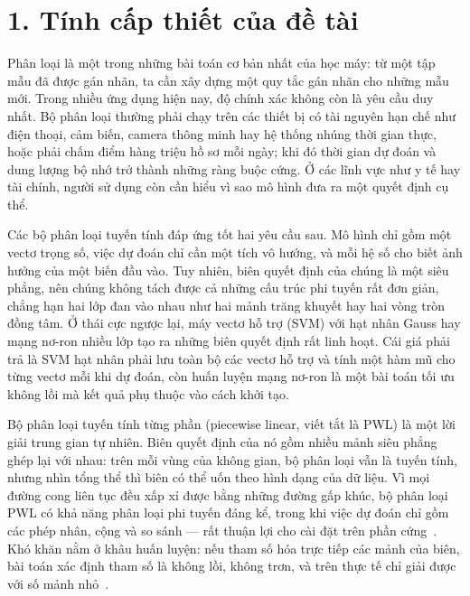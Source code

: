
\section*{1. Tính cấp thiết của đề tài}

Phân loại là một trong những bài toán cơ bản nhất của học máy: từ một tập mẫu đã được gán nhãn, ta cần xây dựng một quy tắc gán nhãn cho những mẫu mới. Trong nhiều ứng dụng hiện nay, độ chính xác không còn là yêu cầu duy nhất. Bộ phân loại thường phải chạy trên các thiết bị có tài nguyên hạn chế như điện thoại, cảm biến, camera thông minh hay hệ thống nhúng thời gian thực, hoặc phải chấm điểm hàng triệu hồ sơ mỗi ngày; khi đó thời gian dự đoán và dung lượng bộ nhớ trở thành những ràng buộc cứng. Ở các lĩnh vực như y tế hay tài chính, người sử dụng còn cần hiểu vì sao mô hình đưa ra một quyết định cụ thể.

Các bộ phân loại tuyến tính đáp ứng tốt hai yêu cầu sau. Mô hình chỉ gồm một vectơ trọng số, việc dự đoán chỉ cần một tích vô hướng, và mỗi hệ số cho biết ảnh hưởng của một biến đầu vào. Tuy nhiên, biên quyết định của chúng là một siêu phẳng, nên chúng không tách được cả những cấu trúc phi tuyến rất đơn giản, chẳng hạn hai lớp đan vào nhau như hai mảnh trăng khuyết hay hai vòng tròn đồng tâm. Ở thái cực ngược lại, máy vectơ hỗ trợ (SVM) với hạt nhân Gauss hay mạng nơ-ron nhiều lớp tạo ra những biên quyết định rất linh hoạt. Cái giá phải trả là SVM hạt nhân phải lưu toàn bộ các vectơ hỗ trợ và tính một hàm mũ cho từng vectơ mỗi khi dự đoán, còn huấn luyện mạng nơ-ron là một bài toán tối ưu không lồi mà kết quả phụ thuộc vào cách khởi tạo.

Bộ phân loại tuyến tính từng phần (piecewise linear, viết tắt là PWL) là một lời giải trung gian tự nhiên. Biên quyết định của nó gồm nhiều mảnh siêu phẳng ghép lại với nhau: trên mỗi vùng của không gian, bộ phân loại vẫn là tuyến tính, nhưng nhìn tổng thể thì biên có thể uốn theo hình dạng của dữ liệu. Vì mọi đường cong liên tục đều xấp xỉ được bằng những đường gấp khúc, bộ phân loại PWL có khả năng phân loại phi tuyến đáng kể, trong khi việc dự đoán chỉ gồm các phép nhân, cộng và so sánh --- rất thuận lợi cho cài đặt trên phần cứng~\cite{kostin2006,webb2010}. Khó khăn nằm ở khâu huấn luyện: nếu tham số hóa trực tiếp các mảnh của biên, bài toán xác định tham số là không lồi, không trơn, và trên thực tế chỉ giải được với số mảnh nhỏ~\cite{bagirov2005}.

